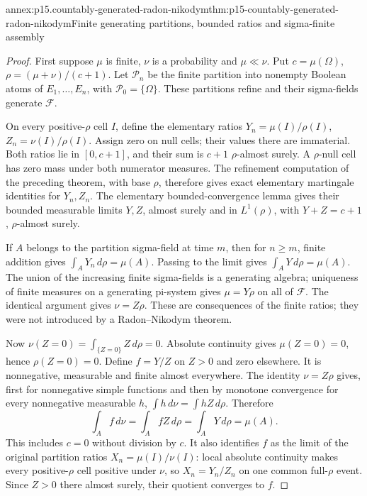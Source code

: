 \begin{annexitem}{annex:p15.countably-generated-radon-nikodym}{thm:p15-countably-generated-radon-nikodym}{Finite generating partitions, bounded ratios and sigma-finite assembly}
\begin{proof}
First suppose \(\mu\) is finite, \(\nu\) is a probability and
\(\mu\ll\nu\). Put \(c=\mu(\Omega)\),
\(\rho=(\mu+\nu)/(c+1)\).
Let \(\mathcal P_n\) be the finite partition into nonempty Boolean
atoms of \(E_1,\ldots,E_n\), with
\(\mathcal P_0=\{\Omega\}\).
These partitions refine and their sigma-fields generate \(\mathcal F\).

On every positive-\(\rho\) cell \(I\), define the elementary ratios
\(Y_n=\mu(I)/\rho(I)\), \(Z_n=\nu(I)/\rho(I)\).
Assign zero on null cells; their values there are immaterial.
Both ratios lie in \([0,c+1]\), and their sum is \(c+1\)
\(\rho\)-almost surely.
A \(\rho\)-null cell has zero mass under both numerator measures.
The refinement computation of the preceding theorem, with base \(\rho\),
therefore gives exact elementary martingale identities for \(Y_n,Z_n\).
The elementary bounded-convergence lemma gives their bounded measurable
limits \(Y,Z\), almost surely and in \(L^1(\rho)\), with
\(Y+Z=c+1\), \(\rho\)-almost surely.

If \(A\) belongs to the partition sigma-field at time \(m\), then for
\(n\geq m\), finite addition gives \(\int_A Y_n\,d\rho=\mu(A)\).
Passing to the limit gives \(\int_A Y\,d\rho=\mu(A)\).
The union of the increasing finite sigma-fields is a generating algebra;
uniqueness of finite measures on a generating pi-system gives
\(\mu=Y\rho\) on all of \(\mathcal F\).
The identical argument gives \(\nu=Z\rho\).
These are consequences of the finite ratios; they were not introduced
by a Radon--Nikodym theorem.

Now \(\nu(Z=0)=\int_{\{Z=0\}}Z\,d\rho=0\).
Absolute continuity gives \(\mu(Z=0)=0\), hence
\(\rho(Z=0)=0\).
Define \(f=Y/Z\) on \(Z>0\) and zero elsewhere.
It is nonnegative, measurable and finite almost everywhere.
The identity \(\nu=Z\rho\) gives, first for nonnegative simple functions
and then by monotone convergence for every nonnegative measurable \(h\),
\(\int h\,d\nu=\int hZ\,d\rho\).
Therefore
\[
                \int_A f\,d\nu
                 =\int_A fZ\,d\rho
                 =\int_A Y\,d\rho=\mu(A).
\]
This includes \(c=0\) without division by \(c\).
It also identifies \(f\) as the limit of the original partition ratios
\(X_n=\mu(I)/\nu(I)\): local absolute continuity makes every
positive-\(\rho\) cell positive under \(\nu\), so \(X_n=Y_n/Z_n\)
on one common full-\(\rho\) event. Since \(Z>0\) there almost surely,
their quotient converges to \(f\).


\end{proof}
\end{annexitem}
